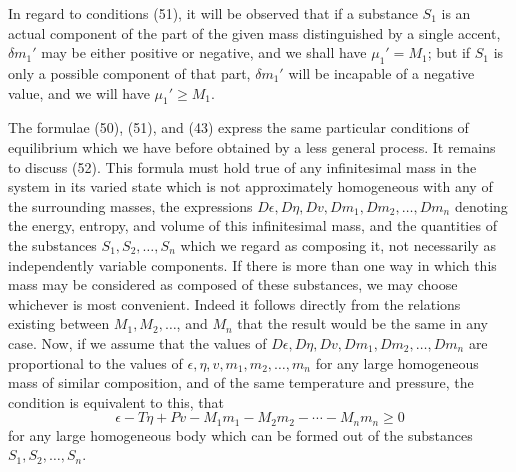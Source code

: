 \documentclass[11pt]{article}
\begin{document}
In regard to conditions (51), it will be observed that if a substance \(S_1\) is an actual component of the part of the given mass distinguished by a single accent, \(\delta m_1'\) may be either positive or negative, and we shall have \(\mu_1'=M_1\); but if \(S_1\) is only a possible component of that part, \(\delta m_1'\) will be incapable of a negative value, and we will have \(\mu_1'\geq M_1\).

The formulae (50), (51), and (43) express the same particular conditions of equilibrium which we have before obtained by a less general process. It remains to discuss (52). This formula must hold true of any infinitesimal mass in the system in its varied state which is not approximately homogeneous with any of the surrounding masses, the expressions \(D\epsilon,D\eta,Dv,Dm_1,Dm_2,\ldots,Dm_n\) denoting the energy, entropy, and volume of this infinitesimal mass, and the quantities of the substances \(S_1,S_2,\ldots,S_n\) which we regard as composing it, not necessarily as independently variable components. If there is more than one way in which this mass may be considered as composed of these substances, we may choose whichever is most convenient. Indeed it follows directly from the relations existing between \(M_1,M_2,\ldots\), and \(M_n\) that the result would be the same in any case. Now, if we assume that the values of \(D\epsilon,D\eta,Dv,Dm_1,Dm_2,\ldots,Dm_n\) are proportional to the values of \(\epsilon,\eta,v,m_1,m_2,\ldots,m_n\) for any large homogeneous mass of similar composition, and of the same temperature and pressure, the condition is equivalent to this, that
\begin{equation}
\epsilon-T\eta+Pv-M_1m_1-M_2m_2-\cdots-M_nm_n\geq 0
\end{equation}
for any large homogeneous body which can be formed out of the substances \(S_1,S_2,\ldots,S_n\).
\end{document}
